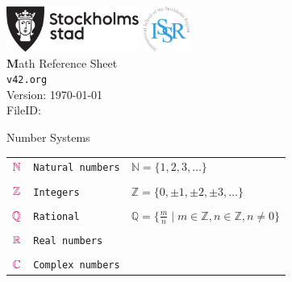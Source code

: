 \documentclass[10pt,landscape]{article}
\newcommand{\documenttitle}{Math Reference Sheet}
\newcommand{\documentsubtitle}{v42.org}
\newcommand{\cRed}[1]{{\color{sthlmRed}{#1}}}
\begin{document}
\raggedright
\footnotesize
\begin{multicols}{3}


\setlength{\premulticols}{1pt}
\setlength{\postmulticols}{1pt}
\setlength{\multicolsep}{1pt}
\setlength{\columnsep}{2pt}


\includegraphics[height=4em]{stockholmstad}	\hspace{0.5cm} \includegraphics[height=4em]{issr} \\
\vspace{0.5cm}
{\Large\textbf\documenttitle} \\
\vspace{0.5cm}
\texttt{\documentsubtitle} \\

Version: \today\\
FileID: \jobname


\begin{mysection}{Number Systems}

\begin{tabular}{@{}ll@{}l@{}}

$\cRed{\mathbb{N}}$	& \texttt{Natural numbers}
							& \qquad $\mathbb{N}=\{1, 2, 3, \ldots  \}$ \\
							&& \\
$\cRed{\mathbb{Z}}$  	& \texttt{Integers}
							& \qquad $\mathbb{Z}=\{0, \pm 1, \pm 2, \pm 3, \ldots \}$ \\
							&& \\
$\cRed{\mathbb{Q}}$  	& \texttt{Rational}
							& \qquad $\mathbb{Q}=\{\frac{m}{n} \mid m \in \mathbb{Z}, n \in \mathbb{Z}, n \ne 0\}$ \\
							&& \\
$\cRed{\mathbb{R}}$  	& \texttt{Real numbers}
							&  \\
							&& \\
$\cRed{\mathbb{C}}$  	& \texttt{Complex numbers}
							&
\end{tabular}
\end{mysection}


\end{multicols}
\end{document}
